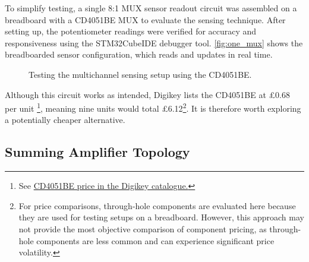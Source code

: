 \documentclass[12pt]{article}
\numberwithin{subsubsubsection}{subsubsection}
\begin{document}
To simplify testing, a single 8:1 MUX sensor readout circuit was assembled on a breadboard with a CD4051BE MUX to evaluate the sensing technique. After setting up, the potentiometer readings were verified for accuracy and responsiveness using the STM32CubeIDE debugger tool. \autoref{fig:one_mux} shows the breadboarded sensor configuration, which reads and updates in real time.

\begin{figure}[H]
    \centering
    \caption{Testing the multichannel sensing setup using the CD4051BE.}
    \label{fig:one_mux}
\end{figure}

Although this circuit works as intended, Digikey lists the CD4051BE at \pounds 0.68 per unit \cite{CD4051BE}\footnote{See \href{https://www.digikey.co.uk/en/products/detail/texas-instruments/CD4051BE/67305}{CD4051BE price in the Digikey catalogue.}}, meaning nine units would total \pounds 6.12\footnote{For price comparisons, through-hole components are evaluated here because they are used for testing setups on a breadboard. However, this approach may not provide the most objective comparison of component pricing, as through-hole components are less common and can experience significant price volatility.}. It is therefore worth exploring a potentially cheaper alternative.

\subsection{Summing Amplifier Topology}
\end{document}
